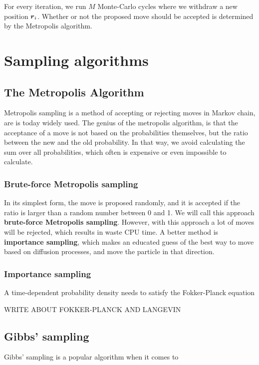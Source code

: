 For every iteration, we run $M$ Monte-Carlo cycles where we withdraw a new position $\boldsymbol{{r}}_i$. Whether or not the proposed move should be accepted is determined by the Metropolis algorithm.

\section{Sampling algorithms}
\subsection{The Metropolis Algorithm}
Metropolis sampling is a method of accepting or rejecting moves in Markov chain, are is today widely used. The genius of the metropolis algorithm, is that the acceptance of a move is not based on the probabilities themselves, but the ratio between the new and the old probability. In that way, we avoid calculating the sum over all probabilities, which often is expensive or even impossible to calculate. 

\subsubsection{Brute-force Metropolis sampling}
In its simplest form, the move is proposed randomly, and it is accepted if the ratio is larger than a random number between 0 and 1. We will call this approach \textbf{brute-force Metropolis sampling}. However, with this approach a lot of moves will be rejected, which results in waste CPU time. A better method is \textbf{importance sampling}, which makes an educated guess of the best way to move based on diffusion processes, and move the particle in that direction. 

\subsubsection{Importance sampling}

A time-dependent probability density needs to satisfy the Fokker-Planck equation 

WRITE ABOUT FOKKER-PLANCK AND LANGEVIN

\subsection{Gibbs' sampling}
Gibbs' sampling is a popular algorithm when it comes to 